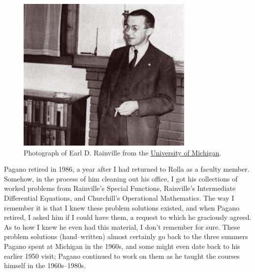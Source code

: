 \documentclass{amsart}
\theoremstyle{definition}
\theoremstyle{remark}
\numberwithin{equation}{section}
\theoremstyle{plain}
\theoremstyle{definition}
\begin{document}
\begin{figure}[h]
\includegraphics[scale=0.9]{images/rainville.jpg}
\caption{Photograph of Earl D. Rainville from the \href{http://um2017.org/faculty-history/faculty/earl-david-rainville}{University of Michigan}.}
\end{figure}
\newpage Pagano retired in 1986, a year after I had returned to Rolla as a faculty member.  Somehow, in the process of him cleaning out his office, I got his collections of worked problems from Rainville's Special Functions, Rainville's Intermediate Differential Equations, and Churchill's Operational Mathematics.  The way I remember it is that I knew these problem solutions existed, and when Pagano retired, I asked him if I could have them, a request to which he graciously agreed.  As to how I knew he even had this material, I don't remember for sure.  These problem solutions (hand--written) almost certainly go back to the three summers Pagano spent at Michigan in the 1960s, and some might even date back to his earlier 1950 visit; Pagano continued to work on them as he taught the courses himself in the 1960s--1980s.  
\end{document}
